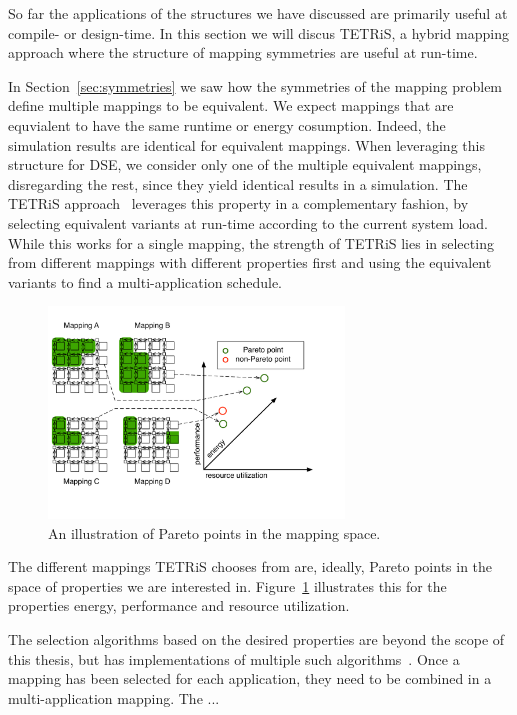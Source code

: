 So far the applications of the structures we have discussed are primarily useful at compile- or design-time.
In this section we will discus \acs{TETRiS}, a hybrid mapping approach where the structure of mapping symmetries are useful at run-time.

In Section~\ref{sec:symmetries} we saw how the symmetries of the mapping problem define multiple mappings to be equivalent.
We expect mappings that are equvialent to have the same runtime or energy cosumption. Indeed, the simulation results are identical for equivalent mappings.
When leveraging this structure for \ac{DSE}, we consider only one of the multiple equivalent mappings, disregarding the rest, since they yield identical results in a simulation.
The \acf{TETRiS} approach~\cite{goens_scopes17} leverages this property in a complementary fashion, by selecting equivalent variants at run-time according to the current system load.
While this works for a single mapping, the strength of \ac{TETRiS} lies in selecting from different mappings with different properties first and using the equivalent variants to find a multi-application schedule.

\begin{figure}[th]
	\centering
	\includegraphics[width=0.7\textwidth]{figures/pareto_mappings.pdf}
	\caption{An illustration of Pareto points in the mapping space.}
	\label{fig:tetris_pareto}
\end{figure}

The different mappings \ac{TETRiS} chooses from are, ideally, Pareto points in the space of properties we are interested in.
Figure~\ref{fig:tetris_pareto} illustrates this for the properties energy, performance and resource utilization.


The selection algorithms based on the desired properties are beyond the scope of this thesis, but \mocasin has implementations of multiple such algorithms~\cite{khasanov_date20}.
Once a mapping has been selected for each application, they need to be combined in a multi-application mapping.
The ...


